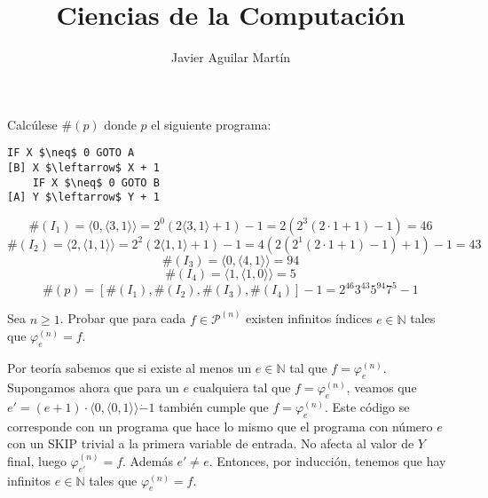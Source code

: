 \documentclass[twoside]{article}
\begin{document}
\title{Ciencias de la Computación}

\author{Javier Aguilar Martín}
\maketitle

\begin{ejercicio}{1}
Calcúlese $\#(p)$ donde $p$ el siguiente programa:
\begin{lstlisting}[mathescape=true]
    IF X $\neq$ 0 GOTO A
[B] X $\leftarrow$ X + 1
    IF X $\neq$ 0 GOTO B
[A] Y $\leftarrow$ Y + 1
\end{lstlisting}
\end{ejercicio}
\begin{solucion}
	\[ \#(I_1) = \langle 0, \langle 3, 1\rangle \rangle = 2^0(2\langle 3,1\rangle+1)-1 = 2(2^3(2\cdot 1+1)-1) = 46 \]
	\[ \#(I_2) = \langle 2, \langle 1, 1\rangle \rangle = 2^2(2\langle1,1\rangle+1)-1 = 4(2(2^1(2\cdot1+1)-1)+1)-1 = 43 \]
	\[ \#(I_3) = \langle 0, \langle 4, 1\rangle \rangle = 94 \]
	\[ \#(I_4) = \langle 1, \langle 1, 0\rangle \rangle = 5 \]
	\[ \#(p) = [\#(I_1),\#(I_2),\#(I_3),\#(I_4)]-1 = 2^{46}3^{43}5^{94}7^5-1 \]
\end{solucion}

\newpage

\begin{ejercicio}{2}
Sea $n ≥ 1$. Probar que para cada $f \in \mathcal{P}^{(n)}$ existen infinitos índices $e \in \mathbb{N}$ tales que $φ_e^{(n)} = f$.
\end{ejercicio}
\begin{solucion}
Por teoría sabemos que si existe al menos un $e \in \mathbb{N}$ tal que $f = φ_e^{(n)}$. Supongamos ahora que para un $e$ cualquiera tal que $f = φ_e^{(n)}$, veamos que $e'=(e+1) \cdot \langle 0,\langle 0,1\rangle \rangle \dot{-}1$ también cumple que $f = φ_e^{(n)}$. Este código se corresponde con un programa que hace lo mismo que el programa con número $e$ con un SKIP trivial a la primera variable de entrada. No afecta al valor de $Y$ final, luego $φ_{e'}^{(n)} = f$. Además $e'\neq e$. Entonces, por inducción, tenemos que hay infinitos $e \in \mathbb{N}$ tales que $φ_e^{(n)} = f$. 
\end{solucion}

\newpage
\end{document}
